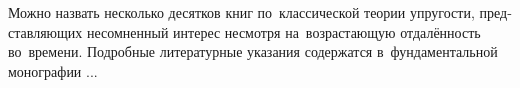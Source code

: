 \vspace{8mm}
\hfill\begin{minipage}[b]{0.95\linewidth}
\fontsize{10}{12}\selectfont

\section*{\wordforbibliography}

\begin{otherlanguage}{russian}

Можно назвать несколько десятков книг по~классической теории упругости, представляющих несомненный интерес несмотря на~возрастающую отдалённость во~времени. Подробные литературные указания содержатся в~фундаментальной монографии ...

\end{otherlanguage}

\end{minipage}
